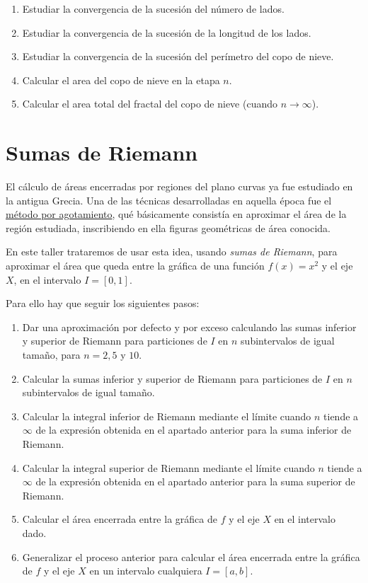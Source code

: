 \documentclass[
  a4paper,
]{scrreport}
\providecommand{\tightlist}{%
  \setlength{\itemsep}{0pt}\setlength{\parskip}{0pt}}\usepackage{longtable,booktabs,array}
\begin{document}
\begin{enumerate}
\def\labelenumi{\alph{enumi}.}
\tightlist
\item
  Estudiar la convergencia de la sucesión del número de lados.
\item
  Estudiar la convergencia de la sucesión de la longitud de los lados.
\item
  Estudiar la convergencia de la sucesión del perímetro del copo de
  nieve.
\item
  Calcular el area del copo de nieve en la etapa \(n\).
\item
  Calcular el area total del fractal del copo de nieve (cuando
  \(n\to \infty\)).
\end{enumerate}


\hypertarget{sumas-de-riemann}{%
\chapter{Sumas de Riemann}\label{sumas-de-riemann}}

El cálculo de áreas encerradas por regiones del plano curvas ya fue
estudiado en la antigua Grecia. Una de las técnicas desarrolladas en
aquella época fue el
\href{https://es.wikipedia.org/wiki/M\%C3\%A9todo_por_agotamiento}{método
por agotamiento}, qué básicamente consistía en aproximar el área de la
región estudiada, inscribiendo en ella figuras geométricas de área
conocida.

En este taller trataremos de usar esta idea, usando \emph{sumas de
Riemann}, para aproximar el área que queda entre la gráfica de una
función \(f(x)=x^2\) y el eje \(X\), en el intervalo \(I=[0,1]\).

Para ello hay que seguir los siguientes pasos:

\begin{enumerate}
\def\labelenumi{\arabic{enumi}.}
\item
  Dar una aproximación por defecto y por exceso calculando las sumas
  inferior y superior de Riemann para particiones de \(I\) en \(n\)
  subintervalos de igual tamaño, para \(n=2, 5\) y \(10\).
\item
  Calcular la sumas inferior y superior de Riemann para particiones de
  \(I\) en \(n\) subintervalos de igual tamaño.
\item
  Calcular la integral inferior de Riemann mediante el límite cuando
  \(n\) tiende a \(\infty\) de la expresión obtenida en el apartado
  anterior para la suma inferior de Riemann.
\item
  Calcular la integral superior de Riemann mediante el límite cuando
  \(n\) tiende a \(\infty\) de la expresión obtenida en el apartado
  anterior para la suma superior de Riemann.
\item
  Calcular el área encerrada entre la gráfica de \(f\) y el eje \(X\) en
  el intervalo dado.
\item
  Generalizar el proceso anterior para calcular el área encerrada entre
  la gráfica de \(f\) y el eje \(X\) en un intervalo cualquiera
  \(I=[a,b]\).
\end{enumerate}
\end{document}
